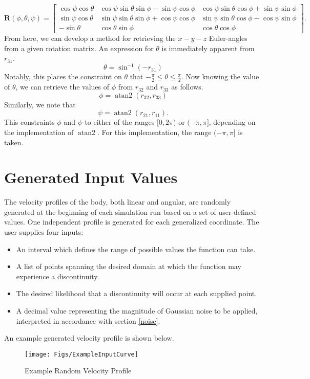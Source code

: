 \documentclass{report}
\DeclareMathOperator{\atantwo}{atan2}
\begin{document}
			\begin{equation}
				\mathbf{R}(\phi,\theta,\psi)=\begin{bmatrix}
					\cos\psi\cos\theta & \cos\psi\sin\theta\sin\phi-\sin\psi\cos\phi & \cos\psi\sin\theta\cos\phi+\sin\psi\sin\phi \\
					\sin\psi\cos\theta & \sin\psi\sin\theta\sin\phi+\cos\psi\cos\phi & \sin\psi\sin\theta\cos\phi-\cos\psi\sin\phi \\
					-\sin\theta & \cos\theta\sin\phi & \cos\theta\cos\phi
				\end{bmatrix}.
			\end{equation}
			From here, we can develop a method for retrieving the $x-y-z$ Euler-angles from a given rotation matrix. An expression for $\theta$ is immediately apparent from $r_{31}$.
			\begin{equation}
				\theta=\sin^{-1}(-r_{31})
			\end{equation}
			Notably, this places the constraint on $\theta$ that $-\frac{\pi}{2}\leq\theta\leq\frac{\pi}{2}$. Now knowing the value of $\theta$, we can retrieve the values of $\phi$ from $r_{32}$ and $r_{33}$ as follows.
			\begin{equation}
				\phi=\atantwo\left(r_{32},r_{33}\right)
			\end{equation}
			Similarly, we note that
			\begin{equation}
				\psi=\atantwo\left(r_{21}, r_{11}\right).
			\end{equation}
			This constraints $\phi$ and $\psi$ to either of the ranges $[0, 2\pi)$ or $(-\pi, \pi]$, depending on the implementation of $\atantwo$. For this implementation, the range $(-\pi, \pi]$ is taken.
		\section{Generated Input Values}
			The velocity profiles of the body, both linear and angular, are randomly generated at the beginning of each simulation run based on a set of user-defined values. One independent profile is generated for each generalized coordinate. The user supplies four inputs:
			\begin{itemize}[label={\bf\textendash}]
				\item An interval which defines the range of possible values the function can take.
				\item A list of points spanning the desired domain at which the function may experience a discontinuity.
				\item The desired likelihood that a discontinuity will occur at each supplied point.
				\item A decimal value representing the magnitude of Gaussian noise to be applied, interpreted in accordance with section \ref{noise}.
			\end{itemize}
			An example generated velocity profile is shown below.
			\begin{figure}[H]
				\centering
				\label{fig:inputCurve}
				\texttt{[image: Figs/ExampleInputCurve]}
				\caption{Example Random Velocity Profile}
			\end{figure}
			
\end{document}
